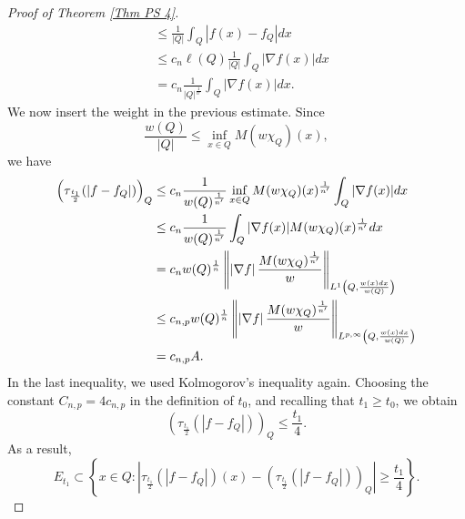 \documentclass[reqno, 10pt, oneside]{amsart}
\numberwithin{equation}{section}
\newcommand{\strt}[1]{\rule{0pt}{#1}}
\numberwithin{theorem}{section}
\newcommand{\1}{{\rm 1\hspace*{-0.4ex}%
\rule{0.1ex}{1.52ex}\hspace*{0.2ex}}}
\begin{document}
\begin{proof}[Proof of Theorem \ref{Thm PS 4}]
\begin{align*}
    &\le \frac{1}{|Q|}\int_Q |f(x)-f_Q|dx \\
    &\le c_n \ell(Q) \frac{1}{|Q|} \int_Q |\nabla f(x)|dx \\
    &= c_n \frac{1}{|Q|^\frac{1}{n'}} \int_Q |\nabla f(x)|dx.
\end{align*}
We now insert the weight in the previous estimate. Since
\begin{equation*}
    \frac{w(Q)}{|Q|} \le \inf_{x\in Q} M(w\chi_Q)(x),
\end{equation*}
we have
\begin{align*}
    \left(\tau_{\frac{t_1}{2}}(|f-f_Q|)\right)_Q
    &\le c_n \frac{1}{w(Q)^\frac{1}{n'}} \inf_{x\in Q} M(w\chi_Q)(x)^\frac{1}{n'} \int_Q |\nabla f(x)|dx \\
    &\le c_n \frac{1}{w(Q)^\frac{1}{n'}} \int_Q |\nabla f(x)|M(w\chi_Q)(x)^\frac{1}{n'}dx \\
    &= c_n w(Q)^\frac{1}{n} \left\| \left| \nabla f \right| \frac{M(w\chi_Q)^\frac{1}{n'}}{w} \right\|_{\strt{2.3ex} L^1\left(Q,\frac{w(x)dx}{w(Q)}\right)} \\
    &\le c_{n,p} w(Q)^\frac{1}{n} \left\| \left| \nabla f \right| \frac{M(w\chi_Q)^\frac{1}{n'}}{w} \right\|_{\strt{2.3ex} L^{p,\infty}\left(Q,\frac{w(x)dx}{w(Q)}\right)} \\
    &= c_{n,p}A.
\end{align*}
In the last inequality, we used Kolmogorov's inequality again. Choosing the constant $C_{n,p} = 4c_{n,p}$ in the definition of $t_0$, and recalling that $t_1\ge t_0$, we obtain
\begin{equation*}
    \left(\tau_{\frac{t_1}{2}}(|f-f_Q|)\right)_Q \le \frac{t_1}{4}.
\end{equation*}
As a result,
\begin{equation*}
    E_{t_1} \subset \left\{x\in Q:\left| \tau_{\frac{t_1}{2}}(|f-f_Q|)(x)-\left(\tau_{\frac{t_1}{2}}(|f-f_Q|)\right)_Q \right| \ge \frac{t_1}{4}\right\}.
\end{equation*}


\end{proof}
\end{document}
